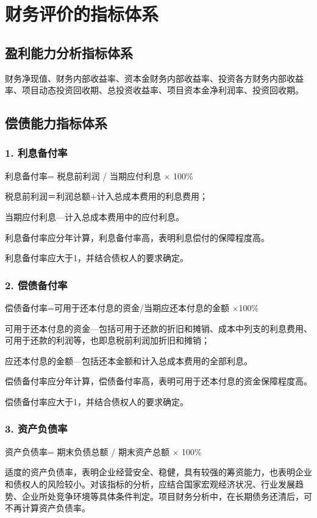 \section{财务评价的指标体系}
\subsection{盈利能力分析指标体系}
财务净现值、财务内部收益率、资本金财务内部收益率、投资各方财务内部收益率、项目动态投资回收期、总投资收益率、项目资本金净利润率、投资回收期。

\subsection{偿债能力指标体系}
\subsubsection{1. 利息备付率}
利息备付率= 税息前利润 / 当期应付利息 $\times$ 100\%

税息前利润＝利润总额+计入总成本费用的利息费用；

当期应付利息—计入总成本费用中的应付利息。

利息备付率应分年计算，利息备付率高，表明利息偿付的保障程度高。

利息备付率应大于1，并结合债权人的要求确定。

\subsubsection{2. 偿债备付率}
偿债备付率=可用于还本付息的资金/当期应还本付息的金额 $\times $100\%

可用于还本付息的资金—包括可用于还款的折旧和摊销、成本中列支的利息费用、可用于还款的利润等，也即息税前利润加折旧和摊销；

应还本付息的金额—包括还本金额和计入总成本费用的全部利息。

偿债备付率应分年计算，偿债备付率高，表明可用于还本付息的资金保障程度高。

偿债备付率应大于1，并结合债权人的要求确定。

\subsubsection{3. 资产负债率}
资产负债率= 期末负债总额 / 期末资产总额 $\times $ 100\%

适度的资产负债率，表明企业经营安全、稳健，具有较强的筹资能力，也表明企业和债权人的风险较小。对该指标的分析，应结合国家宏观经济状况、行业发展趋势、企业所处竞争环境等具体条件判定。项目财务分析中，在长期债务还清后，可不再计算资产负债率。

